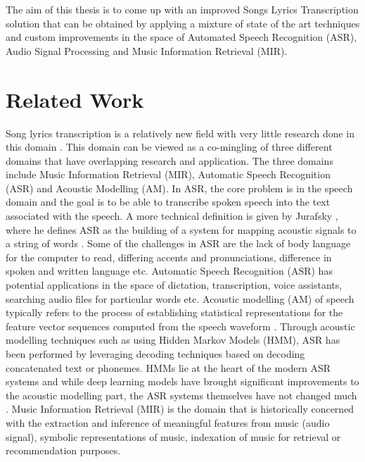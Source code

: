 The aim of this thesis is to come up with an improved Songs Lyrics Transcription solution that can be obtained by applying a mixture of state of the art techniques and custom improvements in the space of Automated Speech Recognition (ASR), Audio Signal Processing and Music Information Retrieval (MIR).

\section{Related Work}
\label{sec:relatedwork}

Song lyrics transcription is a relatively new field with very little research done in this domain \cite{gao2022automatic}. This domain can be viewed as a co-mingling of three different domains that have overlapping research and application. The three domains include Music Information Retrieval (MIR), Automatic Speech Recognition (ASR) and Acoustic Modelling (AM). In ASR, the core problem is in the speech domain and the goal is to be able to transcribe spoken speech into the text associated with the speech. A more technical definition is given by Jurafsky \cite{jurafsky2000speech} , where he defines ASR as the building of a system for mapping acoustic signals to a string of words \cite{jurafsky2000speech} . Some of the challenges in ASR  \cite{forsberg2003speech} are the lack of body language for the computer to read, differing accents and pronunciations, difference in spoken and written language etc. Automatic Speech Recognition (ASR) has potential applications in the space of dictation, transcription, voice assistants, searching audio files for particular words etc. Acoustic modelling (AM) of speech typically refers to the process of establishing statistical representations for the feature vector sequences computed from the speech waveform \cite{karpagavalli2016review}. Through acoustic modelling techniques such as using Hidden Markov Models (HMM), ASR has been performed by leveraging decoding techniques based on decoding concatenated text or phonemes. HMMs lie at the heart of the modern ASR systems and while deep learning models have brought significant improvements to the acoustic modelling part, the ASR systems themselves have not changed much \cite{gales2008application}. Music Information Retrieval (MIR) is the domain that is historically concerned with the extraction and inference of meaningful features from music (audio signal), symbolic representations of music, indexation of music for retrieval or recommendation purposes. 


